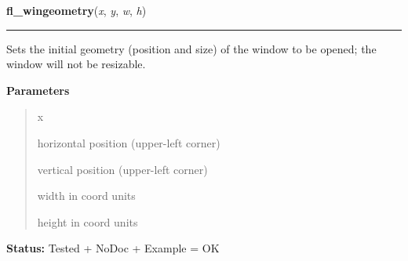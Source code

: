 \hspace{.8\funcindent}\begin{boxedminipage}{\funcwidth}

    \raggedright \textbf{fl\_wingeometry}(\textit{x}, \textit{y}, \textit{w}, \textit{h})

    \vspace{-1.5ex}

    \rule{\textwidth}{0.5\fboxrule}
\setlength{\parskip}{2ex}
    Sets the initial geometry (position and size) of the window to be 
    opened; the window will not be resizable.

\setlength{\parskip}{1ex}
      \textbf{Parameters}
      \vspace{-1ex}

      \begin{quote}
        \begin{Ventry}{x}

          \item[x]

          horizontal position (upper-left corner)

          \item[y]

          vertical position (upper-left corner)

          \item[w]

          width in coord units

          \item[h]

          height in coord units

        \end{Ventry}

      \end{quote}

\textbf{Status:} Tested + NoDoc + Example = OK



    \end{boxedminipage}

    \label{xformslib:library:fl_wingeometry}

    \vspace{0.5ex}

